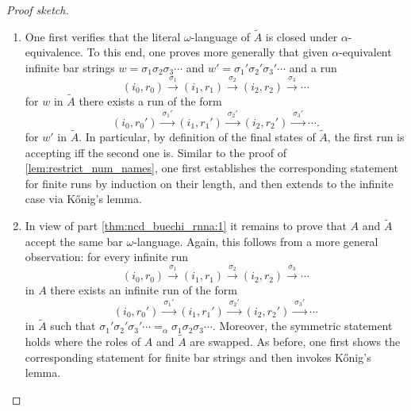 \documentclass[final,a4paper,UKenglish,thm-restate,autoref,numberwithinsect]{lipics-v2021}
\numberwithin{equation}{section}
\newcommand{\xto}[1]{\xrightarrow{~#1~}}
\newcommand{\tl}{\widetilde}
\newcommand{\+}[1]{\mathcal{#1}\xspace}
\theoremstyle{definition}
\begin{document}
\begin{proof}[Proof sketch]
  \begin{enumerate}
  \item\label{thm:ncd_buechi_rnna:1} One first verifies that the
    literal $\omega$-language of $\tl{A}$ is closed under
    $\alpha$-equi\-va\-lence. To this end, one proves more generally
    that given $\alpha$-equivalent infinite bar strings
    $w=\sigma_1\sigma_2\sigma_3\cdots$ and
    $w'=\sigma_1'\sigma_2'\sigma_3'\cdots$ and a run
    \[
      (i_0,r_0)\xto{\sigma_1} (i_1,r_1)\xto{\sigma_2}
      (i_2,r_2)\xto{\sigma_3} \cdots
    \]
    for $w$ in $\tl{A}$ there exists a run of the form
    \[
      (i_0,r_0')\xto{\sigma_1'} (i_1,r_1')\xto{\sigma_2'}
      (i_2,r_2')\xto{\sigma_3'} \cdots.
    \]
    for $w'$ in $\tl{A}$. In particular, by definition of the final
    states of $\tl{A}$, the first run is accepting iff the second one
    is. Similar to the proof of \autoref{lem:restrict_num_names}, one
    first establishes the corresponding statement for finite runs by
    induction on their length, and then extends to the infinite case
    via K\H{o}nig's lemma.
  
  \item In view of part \ref{thm:ncd_buechi_rnna:1} it remains to prove
    that $A$ and $\tl{A}$ accept the same bar
    $\omega$-language. Again, this follows from a more general
    observation: for every infinite run
    \[
      (i_0,r_0)\xto{\sigma_1} (i_1,r_1)\xto{\sigma_2}
      (i_2,r_2)\xto{\sigma_3} \cdots
    \]
    in $A$ there exists an infinite run of the form 
    \[
      (i_0,r_0')\xto{\sigma_1'} (i_1,r_1')\xto{\sigma_2'}
      (i_2,r_2')\xto{\sigma_3'} \cdots
    \]
    in $\tl{A}$ such that
    $\sigma_1'\sigma_2'\sigma_3'\cdots =_\alpha
    \sigma_1\sigma_2\sigma_3\cdots$. Moreover, the symmetric statement
    holds where the roles of $A$ and $\tl{A}$ are swapped. As before,
    one first shows the corresponding statement for finite bar strings
    and then invokes K\H{o}nig's lemma.\qedhere
  \end{enumerate}
\end{proof}
%
%
\end{document}
